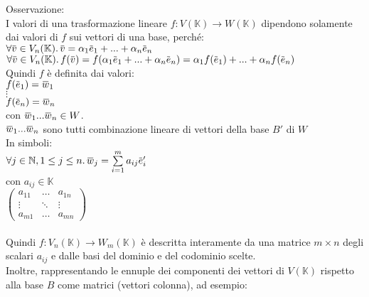 \documentclass[a4paper, twoside, italian, 11pt]{book}
\newcommand{\overbar}[1] {\mkern 1.5mu\overline{\mkern-1.5mu#1\mkern-1.5mu}\mkern 1.5mu}
\newcommand{\N}{\mathbb N}
\newcommand{\K}{\mathbb K}
\begin{document}
\noindent
Osservazione: \\
I valori di una trasformazione lineare $f : V(\K) \rightarrow W(\K)$ dipendono solamente dai valori di $f$ sui vettori di una base, perché: \\

$\forall \overbar v \in V_n(\K) \ldotp \overbar v = \alpha_1 \overbar e_1 + ... + \alpha_n \overbar e_n$ \\

$\forall \overbar v \in V_n(\K) \ldotp f(\overbar v) = f(\alpha_1 \overbar e_1 + ... + \alpha_n \overbar e_n) = \alpha_1 f(\overbar e_1) + ... + \alpha_n f(\overbar e_n)$ \\

\noindent
Quindi $f$ è definita dai valori: \\

$f(\overbar e_1) = \overbar w_1$ \\
\indent
$\vdots$ \\
\indent
$f(\overbar e_n) = \overbar w_n$ \\

\noindent
con $\overbar w_1 ... \overbar w_n \in W$. \\

\noindent
$\overbar w_1 ... \overbar w_n$ sono tutti combinazione lineare di vettori della base $B'$ di $W$ \\

\noindent
In simboli: \\

$\forall j \in \N, 1 \leq j \leq n \ldotp \overbar w_j = \sum\limits_{i = 1}^{m} a_{ij} \overbar e'_i$ \\

\noindent
con $a_{ij} \in \K$ \\

\noindent
$\begin{pmatrix}
a_{11} & \dots & a_{1n} \\
\vdots & \ddots & \vdots \\
a_{m1} & \dots & a_{mn}
\end{pmatrix}$ \\\\

\noindent
Quindi $f : V_n(\K) \rightarrow W_m(\K)$ è descritta interamente da una matrice $m \times n$ degli scalari $a_{ij}$ e dalle basi del dominio e del codominio scelte.\\

\noindent
Inoltre, rappresentando le ennuple dei componenti dei vettori di $V(\K)$ rispetto alla base $B$ come matrici (vettori colonna), ad esempio: \\
\end{document}
